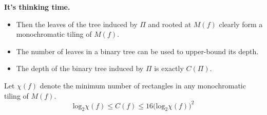 \begin{center}
\textbf{It's thinking time.}
\end{center}
\begin{itemize}
\item Then the leaves of the tree induced by $\Pi$ and rooted at $M(f)$ clearly form a monochromatic tiling of $M(f)$.
\item The number of leaves in a binary tree can be used to upper-bound its depth.
\item The depth of the binary tree induced by $\Pi$ is exactly $C(\Pi)$.
\end{itemize}
\pause
\begin{theorem}
Let $\chi(f)$ denote the minimum number of rectangles in any monochromatic tiling of $M(f)$.
\[\text{log}_2 \chi(f) \leq
	C(f) \leq
		16 \big( \text{log}_2 \chi(f) \big)^2
\]
\end{theorem}